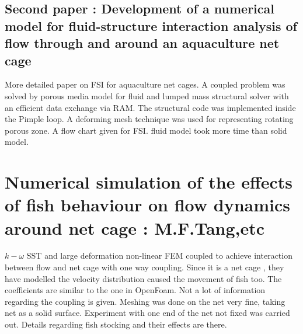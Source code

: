 \documentclass[letterpaper,12pt]{article}
\begin{document}
\subsection{Second paper : Development of a numerical model for fluid-structure interaction analysis
of flow through and around an aquaculture net cage}
More detailed paper on FSI for aquaculture net cages. A coupled problem was solved by porous media model for fluid and lumped mass structural solver with an efficient data exchange via RAM. The structural code was implemented inside the Pimple loop. A deforming mesh technique was used for representing rotating porous zone. A flow chart given for FSI. fluid model took more time than solid model. 



\section{Numerical simulation of the effects of fish behaviour on flow dynamics around net cage : M.F.Tang,etc}
$k-\omega$ SST and large deformation non-linear FEM coupled to achieve interaction between flow and net cage with one way coupling. Since it is a net cage , they have modelled the velocity distribution caused the movement of fish too. The coefficients are similar to the one in OpenFoam. Not a lot of information regarding the coupling is given. Meshing was done on the net very fine, taking net as a solid surface. Experiment with one end of the net not fixed was carried out. Details regarding fish stocking and their effects are there.


\end{document}

